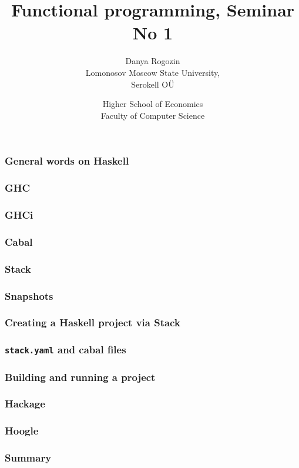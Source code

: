 \documentclass[10pt,pdf,utf8,russian,aspectratio=169]{beamer}
\title{Functional programming, Seminar No 1}
\author{Danya Rogozin \\ Lomonosov Moscow State University, \\ Serokell O\"{U}}
\date{Higher School of Economics \\ Faculty of Computer Science}
\begin{document}
\maketitle

\begin{frame}
  \frametitle{General words on Haskell}
\end{frame}

\begin{frame}
  \frametitle{GHC}
\end{frame}

\begin{frame}
  \frametitle{GHCi}
\end{frame}

\begin{frame}
  \frametitle{Cabal}
\end{frame}

\begin{frame}
  \frametitle{Stack}
\end{frame}

\begin{frame}
  \frametitle{Snapshots}
\end{frame}

\begin{frame}
  \frametitle{Creating a Haskell project via Stack}
\end{frame}

\begin{frame}
  \frametitle{\verb"stack.yaml" and cabal files}
\end{frame}

\begin{frame}
  \frametitle{Building and running a project}
\end{frame}

\begin{frame}
  \frametitle{Hackage}
\end{frame}

\begin{frame}
  \frametitle{Hoogle}
\end{frame}

\begin{frame}
  \frametitle{Summary}
\end{frame}
\end{document}
